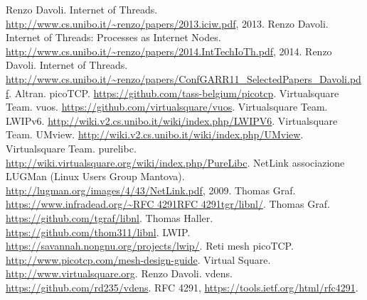 
\begin{thebibliography}{90}             %
\rhead[\fancyplain{}{\bfseries \leftmark}]{\fancyplain{}{\bfseries
\thepage}}
 Renzo Davoli. Internet of Threads. \url{http://www.cs.unibo.it/~renzo/papers/2013.iciw.pdf}, 2013.
 Renzo Davoli. Internet of Threads: Processes as Internet Nodes. \url{http://www.cs.unibo.it/~renzo/papers/2014.IntTechIoTh.pdf}, 2014.
 Renzo Davoli. Internet of Threads. \url{http://www.cs.unibo.it/~renzo/papers/ConfGARR11_SelectedPapers_Davoli.pdf}.
 Altran. picoTCP. \url{https://github.com/tass-belgium/picotcp}.
 Virtualsquare Team. vuos. \url{https://github.com/virtualsquare/vuos}.
 Virtualsquare Team. LWIPv6. \url{http://wiki.v2.cs.unibo.it/wiki/index.php/LWIPV6}.
 Virtualsquare Team. UMview. \url{http://wiki.v2.cs.unibo.it/wiki/index.php/UMview}.
 Virtualsquare Team. purelibc. \url{http://wiki.virtualsquare.org/wiki/index.php/PureLibc}.
 NetLink associazione LUGMan (Linux Users Group Mantova). \url{http://lugman.org/images/4/43/NetLink.pdf}, 2009.
 Thomas Graf. \url{https://www.infradead.org/~RFC 4291RFC 4291tgr/libnl/}.
 Thomas Graf. \url{https://github.com/tgraf/libnl}.
 Thomas Haller. \url{https://github.com/thom311/libnl}.
 LWIP. \url{https://savannah.nongnu.org/projects/lwip/}.
 Reti mesh picoTCP. \url{http://www.picotcp.com/mesh-design-guide}.
 Virtual Square. \url{http://www.virtualsquare.org}.
 Renzo Davoli. vdens. \url{https://github.com/rd235/vdens}.
 RFC 4291, \url{https://tools.ietf.org/html/rfc4291}.
\end{thebibliography}
\clearpage{\pagestyle{empty}\cleardoublepage}
